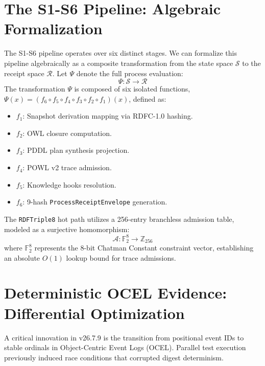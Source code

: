 \documentclass[12pt, a4paper]{report}
\begin{document}
\chapter{The S1-S6 Pipeline: Algebraic Formalization}
The S1-S6 pipeline operates over six distinct stages. We can formalize this pipeline algebraically as a composite transformation from the state space $\mathcal{S}$ to the receipt space $\mathcal{R}$. Let $\Psi$ denote the full process evaluation:
\begin{equation}
\Psi: \mathcal{S} \to \mathcal{R}
\end{equation}
The transformation $\Psi$ is composed of six isolated functions, $\Psi(x) = (f_6 \circ f_5 \circ f_4 \circ f_3 \circ f_2 \circ f_1)(x)$, defined as:
\begin{itemize}
    \item $f_1$: Snapshot derivation mapping via RDFC-1.0 hashing.
    \item $f_2$: OWL closure computation.
    \item $f_3$: PDDL plan synthesis projection.
    \item $f_4$: POWL v2 trace admission.
    \item $f_5$: Knowledge hooks resolution.
    \item $f_6$: 9-hash \texttt{ProcessReceiptEnvelope} generation.
\end{itemize}

The \texttt{RDFTriple8} hot path utilizes a 256-entry branchless admission table, modeled as a surjective homomorphism:
\begin{equation}
\mathcal{A}: \mathbb{F}_2^8 \to \mathbb{Z}_{256}
\end{equation}
where $\mathbb{F}_2^8$ represents the 8-bit Chatman Constant constraint vector, establishing an absolute $O(1)$ lookup bound for trace admissions.

\chapter{Deterministic OCEL Evidence: Differential Optimization}
A critical innovation in v26.7.9 is the transition from positional event IDs to stable ordinals in Object-Centric Event Logs (OCEL). Parallel test execution previously induced race conditions that corrupted digest determinism.
\end{document}
